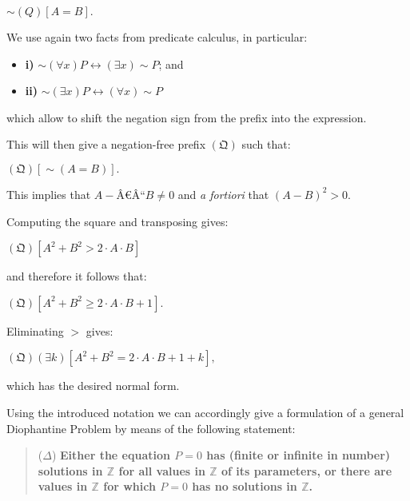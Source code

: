 \documentclass[12pt]{article}
\begin{document}
\begin{center}
$\sim {(Q) [A = B]}.$
\end{center}

We use again two facts from predicate calculus, in particular:

\begin{itemize} 
\item \textbf{i)} $\sim (\forall x) P \leftrightarrow (\exists x) \sim P$; and 

\item \textbf{ii)} $\sim (\exists x) P \leftrightarrow (\forall x) \sim P$ 
\end{itemize}

which allow to shift the negation sign from the prefix into the expression.

This will then give a negation-free prefix $(\mathfrak{Q})$ such that:

\begin{center} 
$(\mathfrak{Q}) [\sim (A = B)].$
\end{center}

This implies that $A -Â€Â“ B \neq 0$ and \emph{a fortiori} that $(A - B)^{2} > 0.$

Computing the square and transposing gives:

\begin{center} 
$(\mathfrak{Q}) [A^2 + B^2 > 2 \cdot A \cdot B]$
\end{center}

and therefore it follows that:
 
\begin{center}
$(\mathfrak{Q}) [A^2 + B^2 \ge 2 \cdot A \cdot B + 1].$
\end{center}

Eliminating $>$ gives:

\begin{center}
$(\mathfrak{Q}) (\exists k) [A^2 + B^2 = 2 \cdot A \cdot B + 1 + k],$
\end{center}

which has the desired normal form.

Using the introduced notation we can accordingly give a formulation of a general Diophantine Problem by means of the following statement:

\begin{quote}
($\Delta$) \textbf{Either the equation $P = 0$ has (finite or infinite in number) solutions in $\mathbb{Z}$ for all values in $\mathbb{Z}$ of its parameters, or there are values in $\mathbb{Z}$ for which $P = 0$ has no solutions in $\mathbb{Z}$.}
\end{quote}
\end{document}
